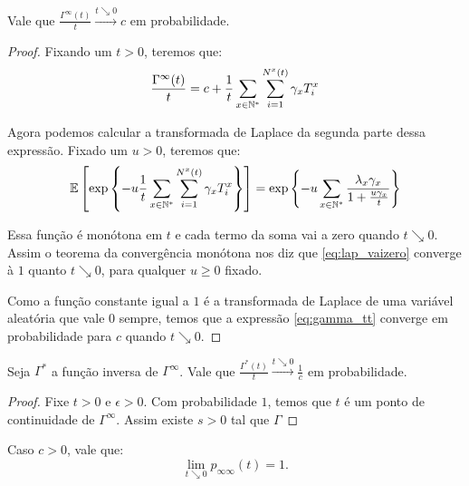 \begin{lema}
  \label{lema:deriv_gamma}
  Vale que $ \frac{\Gamma^{\infty}(t)}{t} \xrightarrow{t \searrow 0}
  c$ em probabilidade.
\end{lema}
\begin{proof}
  Fixando um $t > 0$, teremos que:
  \begin{equation}
    \label{eq:gamma_tt}
    \frac{\Gamma^{\infty}(t)}{t} = 
    c + \frac{1}{t} \sum_{x \in {\mathbb{N^*}}} \sum_{i = 1}^{N^x(t)}
    \gamma_x T^x_i
  \end{equation}

  Agora podemos calcular a transformada de Laplace da segunda parte
  dessa expressão. Fixado um $u > 0$, teremos que:
  \begin{equation}
    \label{eq:lap_vaizero}
    \E \left[ \exp\left\{
      -u \frac{1}{t} \sum_{x \in \Nz} \sum_{i=1}^{N^x(t)} \gamma_x T^x_i
    \right\} \right] =
    \exp \left\{
      - u \sum_{x \in \Nz}  \frac{\lambda_x \gamma_x}{1 +
        \frac{u \gamma_x}{t}}
    \right\} %
  \end{equation}

  Essa função é monótona em $t$ e cada termo da soma
  vai a zero quando $t \searrow 0$.  Assim o teorema da convergência
  monótona nos diz que \ref{eq:lap_vaizero} converge à $1$ quanto $t
  \searrow 0$, para qualquer $u \geq 0$ fixado.

  Como a função constante igual a $1$ é a transformada de Laplace de
  uma variável aleatória que vale $0$ sempre, temos que a expressão
  \ref{eq:gamma_tt} converge em probabilidade para $c$ quando $t
  \searrow 0$.
\end{proof}

\begin{lema}
  \label{lema:deriv_inv_gamma}
  Seja $\Gamma^{*}$  a função inversa de $\Gamma^\infty$.
  Vale que $ \frac{\Gamma^{*}(t)}{t} \xrightarrow{t \searrow 0}
  \frac{1}{c}$ em probabilidade.
\end{lema}
\begin{proof}

  Fixe $t > 0$ e $\epsilon > 0$. Com probabilidade $1$, temos que $t$
  é um ponto de continuidade de $\Gamma^\infty$. Assim existe $s > 0$
  tal que $\Gamma$

\end{proof}

\begin{proposicao}
  \label{prop:continuidade}
  Caso $c > 0$, vale que:
  \begin{displaymath}
    \lim_{t \searrow 0}p_{\infty \infty}(t) = 1.    
  \end{displaymath}
\end{proposicao}

